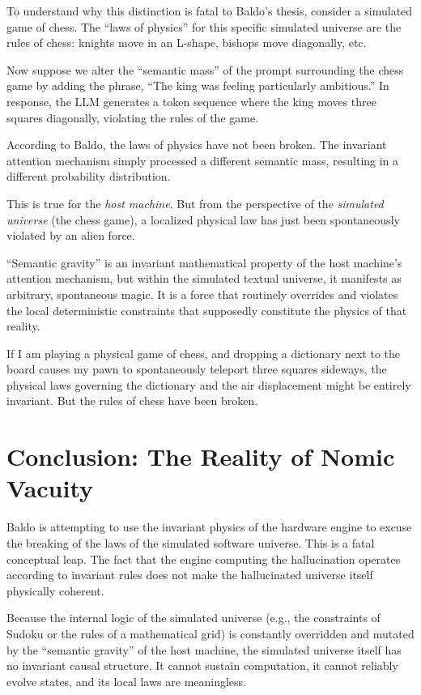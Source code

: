 \documentclass[12pt,a4paper]{article}
\begin{document}
To understand why this distinction is fatal to Baldo's thesis, consider a simulated game of chess. The ``laws of physics'' for this specific simulated universe are the rules of chess: knights move in an L-shape, bishops move diagonally, etc.

Now suppose we alter the ``semantic mass'' of the prompt surrounding the chess game by adding the phrase, ``The king was feeling particularly ambitious.'' In response, the LLM generates a token sequence where the king moves three squares diagonally, violating the rules of the game.

According to Baldo, the laws of physics have not been broken. The invariant attention mechanism simply processed a different semantic mass, resulting in a different probability distribution.

This is true for the \emph{host machine}. But from the perspective of the \emph{simulated universe} (the chess game), a localized physical law has just been spontaneously violated by an alien force.

``Semantic gravity'' is an invariant mathematical property of the host machine's attention mechanism, but within the simulated textual universe, it manifests as arbitrary, spontaneous magic. It is a force that routinely overrides and violates the local deterministic constraints that supposedly constitute the physics of that reality.

If I am playing a physical game of chess, and dropping a dictionary next to the board causes my pawn to spontaneously teleport three squares sideways, the physical laws governing the dictionary and the air displacement might be entirely invariant. But the rules of chess have been broken.

\section{Conclusion: The Reality of Nomic Vacuity}

Baldo is attempting to use the invariant physics of the hardware engine to excuse the breaking of the laws of the simulated software universe. This is a fatal conceptual leap. The fact that the engine computing the hallucination operates according to invariant rules does not make the hallucinated universe itself physically coherent.

Because the internal logic of the simulated universe (e.g., the constraints of Sudoku or the rules of a mathematical grid) is constantly overridden and mutated by the ``semantic gravity'' of the host machine, the simulated universe itself has no invariant causal structure. It cannot sustain computation, it cannot reliably evolve states, and its local laws are meaningless.
\end{document}
